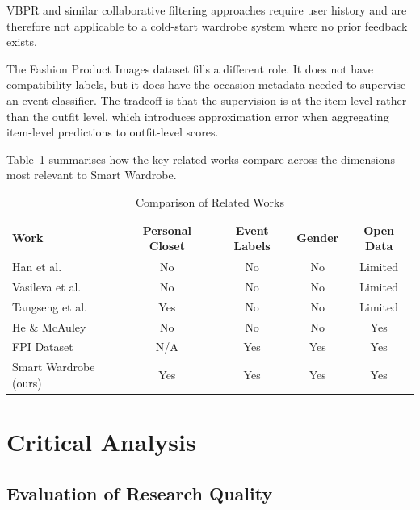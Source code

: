 \documentclass[conference]{IEEEtran}
\begin{document}
VBPR and similar collaborative filtering approaches require user history and are therefore not applicable to a cold-start wardrobe system where no prior feedback exists.

The Fashion Product Images dataset fills a different role. It does not have compatibility labels, but it does have the occasion metadata needed to supervise an event classifier. The tradeoff is that the supervision is at the item level rather than the outfit level, which introduces approximation error when aggregating item-level predictions to outfit-level scores.

Table~\ref{tab:comparison} summarises how the key related works compare across the dimensions most relevant to Smart Wardrobe.

\begin{table}[htbp]
\caption{Comparison of Related Works}
\begin{center}
\renewcommand{\arraystretch}{1.2}
\begin{tabular}{|l|c|c|c|c|}
\hline
\textbf{Work} & \textbf{Personal Closet} & \textbf{Event Labels} & \textbf{Gender} & \textbf{Open Data} \\
\hline
Han et al. \cite{b2}      & No  & No  & No  & Limited \\
Vasileva et al. \cite{b3} & No  & No  & No  & Limited \\
Tangseng et al. \cite{b4} & Yes & No  & No  & Limited \\
He \& McAuley \cite{b5}   & No  & No  & No  & Yes \\
FPI Dataset \cite{b6}     & N/A & Yes & Yes & Yes \\
Smart Wardrobe (ours)     & Yes & Yes & Yes & Yes \\
\hline
\end{tabular}
\label{tab:comparison}
\end{center}
\end{table}

\section{Critical Analysis}

\subsection{Evaluation of Research Quality}
\end{document}
